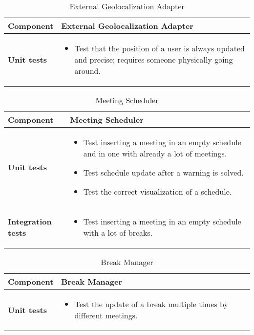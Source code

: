 \begin{table}[h]	
	\centering
	\def\arraystretch{1.5}
	\begin{tabular}{|m{4cm}|m{12cm}|}
		\hline
		\textbf{Component} & External Geolocalization Adapter \\ \hline
		\textbf{Unit tests} & 
			\begin{itemize}
			\item Test that the position of a user is always updated and precise; requires someone physically going around.
			\end{itemize} \\ \hline
	\end{tabular}
	\caption{External Geolocalization Adapter}
\end{table}

\begin{table}[h]	
	\centering
	\def\arraystretch{1.5}
	\begin{tabular}{|m{4cm}|m{12cm}|}
		\hline
		\textbf{Component} & Meeting Scheduler \\ \hline
		\textbf{Unit tests} & 
			\begin{itemize}
			\item Test inserting a meeting in an empty schedule and in one with already a lot of meetings.
			\item Test schedule update after a warning is solved.
			\item Test the correct visualization of a schedule.
			\end{itemize} \\ \hline
		\textbf{Integration tests} & 
			\begin{itemize}
			\item Test inserting a meeting in an empty schedule with a lot of breaks.
			\end{itemize} \\ \hline
	\end{tabular}
	\caption{Meeting Scheduler}
\end{table}

\begin{table}[h]	
	\centering
	\def\arraystretch{1.5}
	\begin{tabular}{|m{4cm}|m{12cm}|}
		\hline
		\textbf{Component} & Break Manager \\ \hline
		\textbf{Unit tests} & 
			\begin{itemize}
			\item Test the update of a break multiple times by different meetings.
			\end{itemize} \\ \hline
	\end{tabular}
	\caption{Break Manager}
\end{table}

